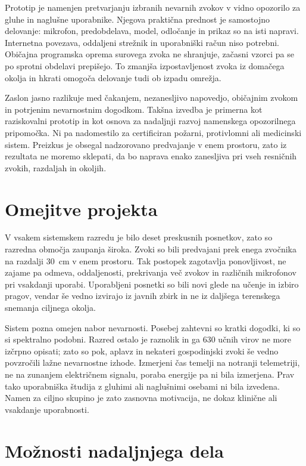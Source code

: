 Prototip je namenjen pretvarjanju izbranih nevarnih zvokov v vidno opozorilo
za gluhe in naglušne uporabnike. Njegova praktična prednost je samostojno
delovanje: mikrofon, predobdelava, model, odločanje in prikaz so na isti
napravi. Internetna povezava, oddaljeni strežnik in uporabniški račun niso
potrebni. Običajna programska oprema surovega zvoka ne shranjuje, začasni
vzorci pa se po sprotni obdelavi prepišejo. To zmanjša izpostavljenost zvoka iz
domačega okolja in hkrati omogoča delovanje tudi ob izpadu omrežja.

Zaslon jasno razlikuje med čakanjem, nezanesljivo napovedjo, običajnim zvokom
in potrjenim nevarnostnim dogodkom. Takšna izvedba je primerna kot raziskovalni
prototip in kot osnova za nadaljnji razvoj namenskega opozorilnega pripomočka.
Ni pa nadomestilo za certificiran požarni, protivlomni ali medicinski sistem.
Preizkus je obsegal nadzorovano predvajanje v enem prostoru, zato iz rezultata
ne moremo sklepati, da bo naprava enako zanesljiva pri vseh resničnih zvokih,
razdaljah in okoljih.

\section{Omejitve projekta}

V vsakem sistemskem razredu je bilo deset preskusnih posnetkov, zato so
razredna območja zaupanja široka. Zvoki so bili predvajani prek enega zvočnika
na razdalji \SI{30}{\centi\meter} v enem prostoru. Tak postopek zagotavlja
ponovljivost, ne zajame pa odmeva, oddaljenosti, prekrivanja več zvokov in
različnih mikrofonov pri vsakdanji uporabi. Uporabljeni posnetki so bili novi
glede na učenje in izbiro pragov, vendar še vedno izvirajo iz javnih zbirk in
ne iz daljšega terenskega snemanja ciljnega okolja.

Sistem pozna omejen nabor nevarnosti. Posebej zahtevni so kratki dogodki, ki
so si spektralno podobni. Razred ostalo je raznolik in ga 630 učnih virov ne
more izčrpno opisati; zato so pok, aplavz in nekateri gospodinjski zvoki še
vedno povzročili lažne nevarnostne izhode. Izmerjeni čas temelji na notranji
telemetriji, ne na zunanjem električnem signalu, poraba energije pa ni bila
izmerjena. Prav tako uporabniška študija z gluhimi ali naglušnimi osebami ni
bila izvedena. Namen za ciljno skupino je zato zasnovna motivacija, ne dokaz
klinične ali vsakdanje uporabnosti.

\section{Možnosti nadaljnjega dela}

